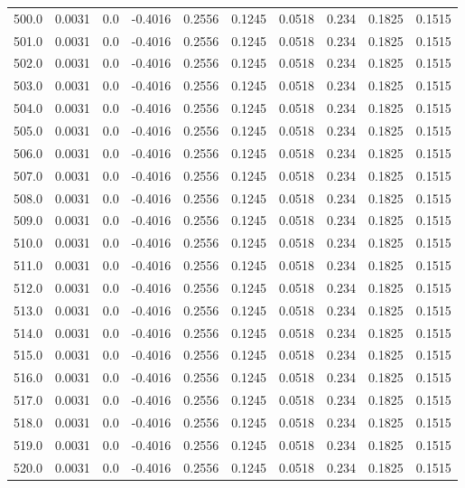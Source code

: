 \begin{longtable}{lrrrrrrrrr}
500.0 & 0.0031 & 0.0 & -0.4016 & 0.2556 & 0.1245 & 0.0518 & 0.234 & 0.1825 & 0.1515 \\
501.0 & 0.0031 & 0.0 & -0.4016 & 0.2556 & 0.1245 & 0.0518 & 0.234 & 0.1825 & 0.1515 \\
502.0 & 0.0031 & 0.0 & -0.4016 & 0.2556 & 0.1245 & 0.0518 & 0.234 & 0.1825 & 0.1515 \\
503.0 & 0.0031 & 0.0 & -0.4016 & 0.2556 & 0.1245 & 0.0518 & 0.234 & 0.1825 & 0.1515 \\
504.0 & 0.0031 & 0.0 & -0.4016 & 0.2556 & 0.1245 & 0.0518 & 0.234 & 0.1825 & 0.1515 \\
505.0 & 0.0031 & 0.0 & -0.4016 & 0.2556 & 0.1245 & 0.0518 & 0.234 & 0.1825 & 0.1515 \\
506.0 & 0.0031 & 0.0 & -0.4016 & 0.2556 & 0.1245 & 0.0518 & 0.234 & 0.1825 & 0.1515 \\
507.0 & 0.0031 & 0.0 & -0.4016 & 0.2556 & 0.1245 & 0.0518 & 0.234 & 0.1825 & 0.1515 \\
508.0 & 0.0031 & 0.0 & -0.4016 & 0.2556 & 0.1245 & 0.0518 & 0.234 & 0.1825 & 0.1515 \\
509.0 & 0.0031 & 0.0 & -0.4016 & 0.2556 & 0.1245 & 0.0518 & 0.234 & 0.1825 & 0.1515 \\
510.0 & 0.0031 & 0.0 & -0.4016 & 0.2556 & 0.1245 & 0.0518 & 0.234 & 0.1825 & 0.1515 \\
511.0 & 0.0031 & 0.0 & -0.4016 & 0.2556 & 0.1245 & 0.0518 & 0.234 & 0.1825 & 0.1515 \\
512.0 & 0.0031 & 0.0 & -0.4016 & 0.2556 & 0.1245 & 0.0518 & 0.234 & 0.1825 & 0.1515 \\
513.0 & 0.0031 & 0.0 & -0.4016 & 0.2556 & 0.1245 & 0.0518 & 0.234 & 0.1825 & 0.1515 \\
514.0 & 0.0031 & 0.0 & -0.4016 & 0.2556 & 0.1245 & 0.0518 & 0.234 & 0.1825 & 0.1515 \\
515.0 & 0.0031 & 0.0 & -0.4016 & 0.2556 & 0.1245 & 0.0518 & 0.234 & 0.1825 & 0.1515 \\
516.0 & 0.0031 & 0.0 & -0.4016 & 0.2556 & 0.1245 & 0.0518 & 0.234 & 0.1825 & 0.1515 \\
517.0 & 0.0031 & 0.0 & -0.4016 & 0.2556 & 0.1245 & 0.0518 & 0.234 & 0.1825 & 0.1515 \\
518.0 & 0.0031 & 0.0 & -0.4016 & 0.2556 & 0.1245 & 0.0518 & 0.234 & 0.1825 & 0.1515 \\
519.0 & 0.0031 & 0.0 & -0.4016 & 0.2556 & 0.1245 & 0.0518 & 0.234 & 0.1825 & 0.1515 \\
520.0 & 0.0031 & 0.0 & -0.4016 & 0.2556 & 0.1245 & 0.0518 & 0.234 & 0.1825 & 0.1515 \\

\end{longtable}
